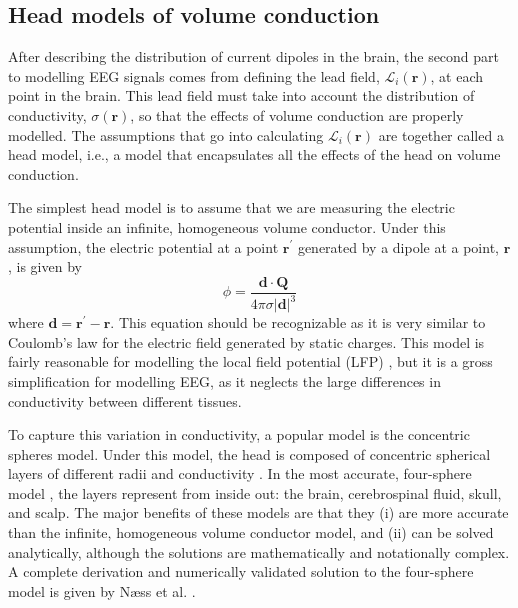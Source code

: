 \subsection{Head models of volume conduction} \label{sec:head_models}
After describing the distribution of current dipoles in the brain, the second part to modelling EEG signals comes from defining the lead field, $\mathcal{L}_i(\bm{r})$, at each point in the brain. This lead field must take into account the distribution of conductivity, $\sigma(\bm{r})$, so that the effects of volume conduction are properly modelled. The assumptions that go into calculating $\mathcal{L}_i(\bm{r})$ are together called a head model, i.e., a model that encapsulates all the effects of the head on volume conduction.

The simplest head model is to assume that we are measuring the electric potential inside an infinite, homogeneous volume conductor. Under this assumption, the electric potential at a point $\bm{r}^\prime$ generated by a dipole at a point, $\bm{r}$, is given by
\begin{equation}
    \phi = \frac{\bm{d} \cdot \bm{Q}}{4\pi\sigma |\bm{d}|^3}
\end{equation}
where $\bm{d}=\bm{r}^\prime-\bm{r}$. This equation should be recognizable as it is very similar to Coulomb's law for the electric field generated by static charges. This model is fairly reasonable for modelling the local field potential (LFP) \cite{Pettersen2012}, but it is a gross simplification for modelling EEG, as it neglects the large differences in conductivity between different tissues.

To capture this variation in conductivity, a popular model is the concentric spheres model. Under this model, the head is composed of concentric spherical layers of different radii and conductivity \cite{Geisler1961}. In the most accurate, four-sphere model \cite{Hosek1978}, the layers represent from inside out: the brain, cerebrospinal fluid, skull, and scalp. The major benefits of these models are that they (i) are more accurate than the infinite, homogeneous volume conductor model, and (ii) can be solved analytically, although the solutions are mathematically and notationally complex. A complete derivation and numerically validated solution to the four-sphere model is given by Næss et al. \cite{Næss2017}.

